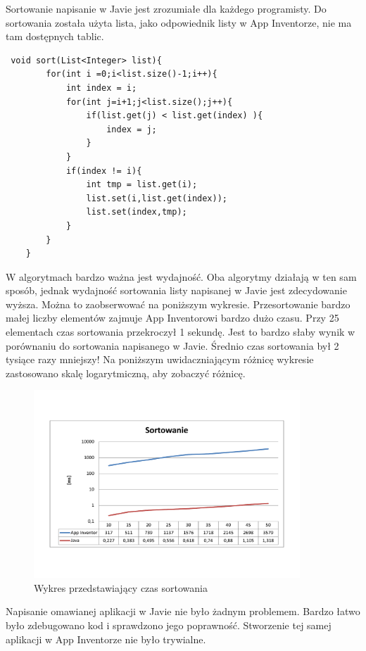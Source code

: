 Sortowanie napisanie w Javie jest zrozumiałe dla każdego programisty. Do sortowania została użyta lista, jako odpowiednik listy w App Inventorze, nie ma tam dostępnych tablic.


\begin{lstlisting}
 void sort(List<Integer> list){
        for(int i =0;i<list.size()-1;i++){
            int index = i;
            for(int j=i+1;j<list.size();j++){
                if(list.get(j) < list.get(index) ){
                    index = j;
                }
            }
            if(index != i){
                int tmp = list.get(i);
                list.set(i,list.get(index));
                list.set(index,tmp);
            }
        }
    }
\end{lstlisting}

W algorytmach bardzo ważna jest wydajność. Oba algorytmy działają w ten sam sposób, jednak wydajność sortowania listy napisanej w Javie jest zdecydowanie wyższa. Można to zaobserwować na poniższym wykresie. Przesortowanie bardzo małej liczby elementów zajmuje App Inventorowi bardzo dużo czasu. Przy 25 elementach czas sortowania przekroczył 1 sekundę. Jest to bardzo słaby wynik w porównaniu do sortowania napisanego w Javie. Średnio czas sortowania był 2 tysiące razy mniejszy! Na poniższym uwidaczniającym różnicę wykresie zastosowano skalę logarytmiczną, aby zobaczyć różnicę.

\begin{figure}[htbp]
\centering\includegraphics[width=10cm]{figures/apps/sortChart}
\caption{Wykres przedstawiający czas sortowania}
\end{figure}

Napisanie omawianej aplikacji w Javie nie było żadnym problemem. Bardzo łatwo było zdebugowano kod i sprawdzono jego poprawność. Stworzenie tej samej aplikacji w App Inventorze nie było trywialne.


